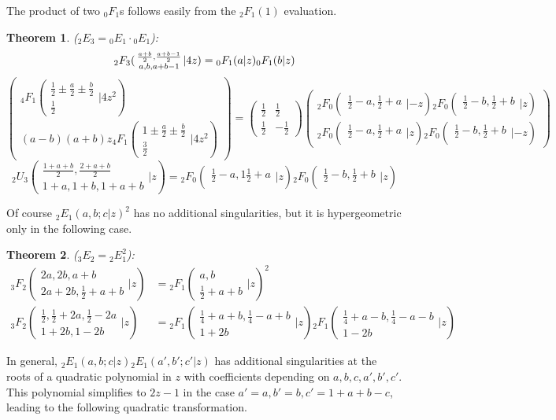 \documentclass[12pt]{article}
\numberwithin{equation}{section}
\newtheorem{theorem}{Theorem}[section]
\newcommand{\Head}[3] {{}_{#1}{#2}_{#3}}
\newcommand{\ArgS}[3] {( \begin{smallmatrix} #1 \\ #2 \end{smallmatrix} | {#3})}
\begin{document}
The product of two $\Head{0}{F}{1}$s follows easily from the $\Head{2}{F}{1}(1)$ evaluation.
\begin{theorem}
\label{thm_0f1_prod}
($\Head{2}{E}{3} = \Head{0}{E}{1} \cdot \Head{0}{E}{1}$):
\begin{equation*}
\Head{2}{F}{3} \ArgS{\frac{a+b}{2},\frac{a+b-1}{2}}{a,b,a+b-1}{4z} = \Head{0}{F}{1}(a|z)\Head{0}{F}{1}(b|z)\\
\end{equation*}
\begin{equation*}
\left(\begin{array}{r}
\Head{4}{F}{1} \ArgS{\frac12 \pm \frac{a}{2} \pm \frac{b}{2}} {\frac12} {4 z^2}\\
(a - b) (a + b) z \Head{4}{F}{1} \ArgS{1 \pm \frac{a}{2} \pm \frac{b}{2}} {\frac32} {4 z^2}
\end{array}\right)
 =
\begin{pmatrix}
\frac12 & \frac12 \\
\frac12 & -\frac12
\end{pmatrix}
\begin{pmatrix}
\Head{2}{F}{0}\ArgS{\frac12 - a, \frac12 + a}{}{-z} \Head{2}{F}{0} \ArgS{\frac12 - b, \frac12 + b}{}{z}\\
\Head{2}{F}{0} \ArgS{\frac12 - a, \frac12 + a} {}{z} \Head{2}{F}{0} \ArgS{\frac12 - b, \frac12+ b} {}{-z}
\end{pmatrix}
\end{equation*}
\begin{equation*}
\Head{2}{U}{3} \ArgS{\frac{1+a+b}2,\frac{2+a+b}2}{1+a,1+b,1+a+b}{z} = \Head{2}{F}{0} \ArgS{\frac12 - a, 1\frac12+a}{}{z} \Head{2}{F}{0} \ArgS{\frac12-b, \frac12+b} {}{z}
\end{equation*}
\end{theorem}
Of course $\Head{2}{E}{1}(a,b;c|z)^2$ has no additional singularities, but it is hypergeometric only in the following case.
\begin{theorem}
($\Head{3}{E}{2} = \Head{2}{E}{1}^2$):
\begin{align*}
\Head{3}{F}{2} \ArgS{2a,2b,a+b}{2a+2b,\frac12+a+b}{z} &= \Head{2}{F}{1} \ArgS{a,b}{\frac12+a+b}{z}^2\\
\Head{3}{F}{2} \ArgS{\frac12,\frac12 + 2a,\frac12-2a}{1+2b,1-2b}{z} &= \Head{2}{F}{1} \ArgS{\frac14+a+b,\frac14-a+b}{1+2b}{z} \Head{2}{F}{1} \ArgS{\frac14+a-b,\frac14-a-b}{1-2b}{z}
\end{align*}
\end{theorem}
In general, $\Head{2}{E}{1}(a,b;c|z)\Head{2}{E}{1}(a',b';c'|z)$ has additional singularities at the roots of a quadratic polynomial in $z$ with coefficients depending on $a,b,c,a',b',c'$. This polynomial simplifies to $2z-1$ in the case $a'=a, b'=b, c'=1+a+b-c$, leading to the following quadratic transformation.
\end{document}

